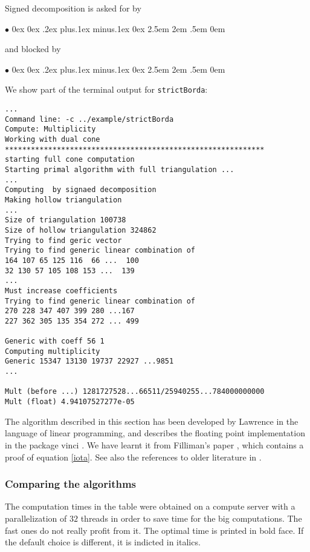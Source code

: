 \documentclass[12pt,a4paper]{scrartcl}
\newcommand{\stdli}{ \topsep0ex \partopsep0ex %
\parsep.2ex plus.1ex minus.1ex \itemsep0ex%
\leftmargin2.5em \labelwidth2em \labelsep.5em \rightmargin0em}%
\renewenvironment{itemize}{\begin{list}{{$\bullet$}}{\stdli}}{\end{list}}
\theoremstyle{definition}
\def\itemtt[#1]{\item[\textbf{\ttt{#1}}]}
\def\ttt{\texttt}
\begin{document}
Signed decomposition is asked for by
\begin{itemize}
	\itemtt[SignedDec]
\end{itemize}
and blocked by
\begin{itemize}
	\itemtt[NoSignedDec]
\end{itemize}

We show part of the terminal output for \ttt{strictBorda}: 
 \begin{Verbatim}
...
Command line: -c ../example/strictBorda 
Compute: Multiplicity 
Working with dual cone
************************************************************
starting full cone computation
Starting primal algorithm with full triangulation ...
...
Computing  by signaed decomposition
Making hollow triangulation
...
Size of triangulation 100738
Size of hollow triangulation 324862
Trying to find geric vector
Trying to find generic linear combination of 
164 107 65 125 116  66 ...  100
32 130 57 105 108 153 ...  139
...
Must increase coefficients
Trying to find generic linear combination of 
270 228 347 407 399 280 ...167
227 362 305 135 354 272 ... 499

Generic with coeff 56 1
Computing multiplicity
Generic 15347 13130 19737 22927 ...9851 
...

Mult (before ...) 1281727528...66511/25940255...784000000000
Mult (float) 4.94107527277e-05
 \end{Verbatim}
 
 The algorithm described in this section has been developed by Lawrence \cite{Lawrence} in the language of linear programming, and \cite{practical} describes the floating point implementation in  the package vinci \cite{vinci}. We have learnt it from Filliman's paper \cite{Filli}, which contains a proof of equation \eqref{iota}. See also the references to older literature in \cite{Filli}.

\subsubsection{Comparing the algorithms}\label{vvv_compare}

The computation times in the table were obtained on a compute server with a parallelization of $32$ threads in order to save time for the big computations. The fast ones do not really profit from it. The optimal time is printed in bold face. If the default choice is different, it is indicted in italics.
\end{document}

